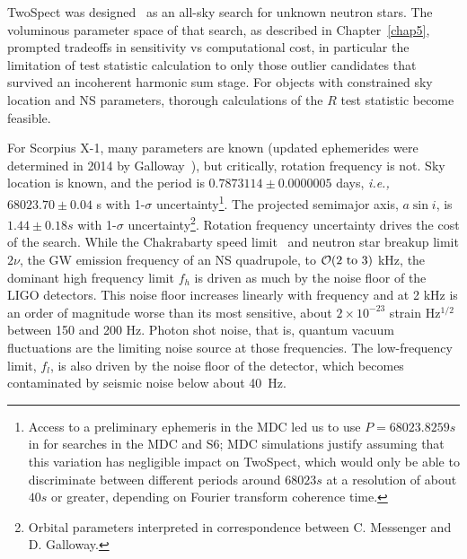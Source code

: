TwoSpect was designed~\cite{GoetzThesis,GoetzTwoSpectMethods2011} as an all-sky search for unknown neutron stars.
The voluminous parameter space of that search, as described in Chapter~\ref{chap5}, prompted tradeoffs in sensitivity vs computational cost, in particular the limitation of test statistic calculation to only those outlier candidates that survived an incoherent harmonic sum stage. 
For objects with constrained sky location and NS parameters, thorough calculations of the $R$ test statistic become feasible.

For Scorpius X-1, many parameters are known (updated ephemerides were determined in 2014 by Galloway~\cite{Galloway2014}), but critically, rotation frequency is not.
Sky location is known, and the period is $0.7873114 \pm 0.0000005$ days, \textit{i.e.,} $68023.70 \pm 0.04$ s with 1-$\sigma$ uncertainty\footnote{Access to a preliminary ephemeris in the MDC led us to use $P = 68023.8259 s$ in for searches in the MDC and S6; MDC simulations justify assuming that this variation has negligible impact on TwoSpect, which would only be able to discriminate between different periods around $68023 s$ at a resolution of about $40 s$ or greater, depending on Fourier transform coherence time.}.
The projected semimajor axis, $a \sin i$, is $1.44 \pm 0.18 s$ with 1-$\sigma$ uncertainty\footnote{Orbital parameters interpreted in correspondence between C. Messenger and D. Galloway.}.
Rotation frequency uncertainty drives the cost of the search.
While the Chakrabarty speed limit~\cite{Chakrabarty2003} and neutron star breakup limit $2\nu$, the GW emission frequency of an NS quadrupole, to $\mathcal{O}(2\textup{ to }3)$ kHz, the dominant high frequency limit $f_h$ is driven as much by the noise floor of the LIGO detectors.
This noise floor increases linearly with frequency and at 2 kHz is an order of magnitude worse than its most sensitive, about $2\times10^{-23}$ strain Hz$^{1/2}$ between 150 and 200 Hz.
Photon shot noise, that is, quantum vacuum fluctuations are the limiting noise source at those frequencies.
The low-frequency limit, $f_l$, is also driven by the noise floor of the detector, which becomes contaminated by seismic noise below about 40~Hz.

